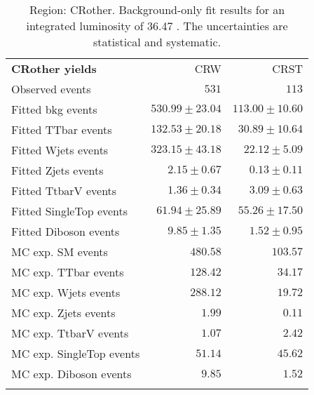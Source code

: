 

\begin{table}
\begin{center}
\setlength{\tabcolsep}{0.0pc}
{\small
\begin{tabular*}{\textwidth}{@{\extracolsep{\fill}}lrr}
\noalign{\smallskip}\hline\noalign{\smallskip}
{\bf CRother yields}           & CRW            & CRST              \\[-0.05cm]
\noalign{\smallskip}\hline\noalign{\smallskip}
Observed events          & $531$              & $113$                    \\
\noalign{\smallskip}\hline\noalign{\smallskip}
Fitted bkg events         & $530.99 \pm 23.04$          & $113.00 \pm 10.60$              \\
\noalign{\smallskip}\hline\noalign{\smallskip}
        Fitted TTbar events         & $132.53 \pm 20.18$          & $30.89 \pm 10.64$              \\
        Fitted Wjets events         & $323.15 \pm 43.18$          & $22.12 \pm 5.09$              \\
        Fitted Zjets events         & $2.15 \pm 0.67$          & $0.13 \pm 0.11$              \\
        Fitted TtbarV events         & $1.36 \pm 0.34$          & $3.09 \pm 0.63$              \\
        Fitted SingleTop events         & $61.94 \pm 25.89$          & $55.26 \pm 17.50$              \\
        Fitted Diboson events         & $9.85 \pm 1.35$          & $1.52 \pm 0.95$              \\
 \noalign{\smallskip}\hline\noalign{\smallskip}
MC exp. SM events              & $480.58$          & $103.57$              \\
\noalign{\smallskip}\hline\noalign{\smallskip}
        MC exp. TTbar events         & $128.42$          & $34.17$              \\
        MC exp. Wjets events         & $288.12$          & $19.72$              \\
        MC exp. Zjets events         & $1.99$          & $0.11$              \\
        MC exp. TtbarV events         & $1.07$          & $2.42$              \\
        MC exp. SingleTop events         & $51.14$          & $45.62$              \\
        MC exp. Diboson events         & $9.85$          & $1.52$              \\
\noalign{\smallskip}\hline\noalign{\smallskip}
\end{tabular*}
}
\end{center}
\caption{Region: CRother. Background-only fit results for an integrated luminosity of 36.47 \ifb. The uncertainties are statistical and systematic.
}
\label{table.bkgonly.CRother}
\end{table}
%